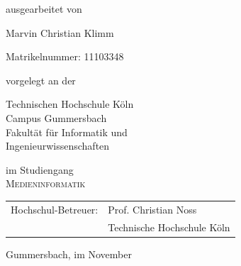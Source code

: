 \begin{titlepage}
\begin{center}
\begin{large}
ausgearbeitet von\\ 
\vspace{0.3cm}
\begin{LARGE}
Marvin Christian Klimm\\
\end{LARGE}
\vspace{0.2cm}
\small Matrikelnummer: 11103348 \\[1.0em]
\end{large}

\vspace{1.2cm}

\vspace{0.6cm}

\begin{large}
vorgelegt an der\\ 
\vspace{0.2cm}
\begin{scshape}
Technischen Hochschule Köln\\
Campus Gummersbach\\
Fakultät für Informatik und\\
Ingenieurwissenschaften\\
\end{scshape}
\end{large}

\vspace{0.6cm}

\begin{large}
im Studiengang\\ 
\vspace{0.1cm}
\textsc{Medieninformatik}
\end{large}


\vspace{1.1cm}

\begin{tabular}{rl}
      Hochschul-Betreuer:  &  Prof. Christian Noss\\
       					&  \small Technische Hochschule Köln \\[1.0em]
\end{tabular}

\vspace{0.7cm}

\begin{large}
Gummersbach, im November \the\year
\end{large}


\end{center}
\end{titlepage}
